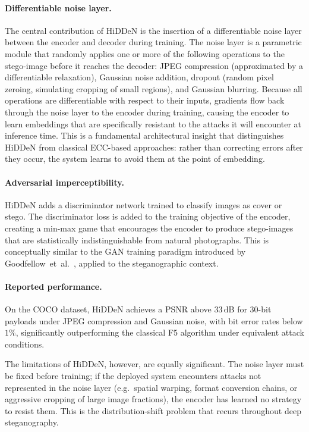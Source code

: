 \documentclass[12pt,a4paper,oneside]{report}
\begin{document}
	\paragraph{Differentiable noise layer.}
	The central contribution of HiDDeN is the insertion of a differentiable noise layer between the
	encoder and decoder during training. The noise layer is a parametric module that randomly applies
	one or more of the following operations to the stego-image before it reaches the decoder: JPEG
	compression (approximated by a differentiable relaxation), Gaussian noise addition, dropout (random
	pixel zeroing, simulating cropping of small regions), and Gaussian blurring. Because all operations
	are differentiable with respect to their inputs, gradients flow back through the noise layer to the
	encoder during training, causing the encoder to learn embeddings that are specifically resistant to
	the attacks it will encounter at inference time. This is a fundamental architectural insight that
	distinguishes HiDDeN from classical ECC-based approaches: rather than correcting errors after they
	occur, the system learns to avoid them at the point of embedding.
	
	\paragraph{Adversarial imperceptibility.}
	HiDDeN adds a discriminator network trained to classify images as cover or stego. The
	discriminator loss is added to the training objective of the encoder, creating a min-max game that
	encourages the encoder to produce stego-images that are statistically indistinguishable from natural
	photographs. This is conceptually similar to the GAN training paradigm introduced by
	Goodfellow~et~al.\ \cite{goodfellow2014generative}, applied to the steganographic context.
	
	\paragraph{Reported performance.}
	On the COCO dataset, HiDDeN achieves a PSNR above $33$\,dB for $30$-bit payloads under JPEG
	compression and Gaussian noise, with bit error rates below $1\%$, significantly outperforming
	the classical F5 algorithm \cite{westfeld2001f5} under equivalent attack conditions.
	
	The limitations of HiDDeN, however, are equally significant. The noise layer must be fixed before
	training; if the deployed system encounters attacks not represented in the noise layer (e.g.\
	spatial warping, format conversion chains, or aggressive cropping of large image fractions), the
	encoder has learned no strategy to resist them. This is the distribution-shift problem that recurs
	throughout deep steganography.
	
\end{document}
